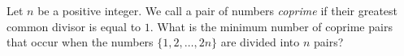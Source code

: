 Let $n$ be a positive integer. We call a pair of numbers \emph{coprime} if their greatest common divisor is equal to $1$. What is the minimum number of coprime pairs that occur when the numbers $\{1, 2, \ldots, 2n\}$ are divided into $n$ pairs?
